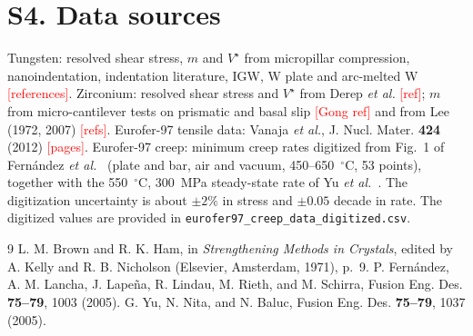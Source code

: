 \documentclass[aps,prl,onecolumn,superscriptaddress,amsmath,amssymb,floatfix]{revtex4-2}
\newcommand{\todo}[1]{\textcolor{red}{[#1]}}
\begin{document}
\section{S4. Data sources}
Tungsten: resolved shear stress, $m$ and $V^\star$ from micropillar compression, nanoindentation, indentation literature, IGW, W plate and arc-melted W \todo{references}. Zirconium: resolved shear stress and $V^\star$ from Derep \emph{et al.} \todo{ref}; $m$ from micro-cantilever tests on prismatic and basal slip \todo{Gong ref} and from Lee (1972, 2007) \todo{refs}. Eurofer-97 tensile data: Vanaja \emph{et al.}, J. Nucl. Mater. \textbf{424} (2012) \todo{pages}. Eurofer-97 creep: minimum creep rates digitized from Fig.~1 of Fern\'andez \emph{et al.}~\cite{S_Fern} (plate and bar, air and vacuum, 450--650~$^\circ$C, 53 points), together with the 550~$^\circ$C, 300~MPa steady-state rate of Yu \emph{et al.}~\cite{S_Yu}. The digitization uncertainty is about $\pm2\%$ in stress and $\pm0.05$ decade in rate. The digitized values are provided in \texttt{eurofer97\_creep\_data\_digitized.csv}.

\begin{thebibliography}{9}
 L. M. Brown and R. K. Ham, in \emph{Strengthening Methods in Crystals}, edited by A. Kelly and R. B. Nicholson (Elsevier, Amsterdam, 1971), p.~9.
 P. Fern\'andez, A. M. Lancha, J. Lape\~na, R. Lindau, M. Rieth, and M. Schirra, Fusion Eng. Des. \textbf{75--79}, 1003 (2005).
 G. Yu, N. Nita, and N. Baluc, Fusion Eng. Des. \textbf{75--79}, 1037 (2005).
\end{thebibliography}
\end{document}

